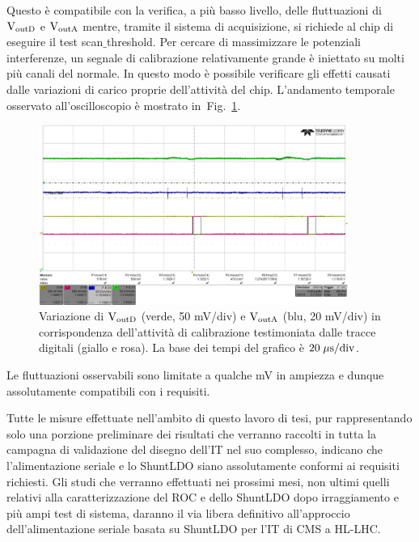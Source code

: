Questo \`e compatibile con la verifica, a pi\`u basso livello, delle fluttuazioni di $\mathrm{V_{outD}}$ e $\mathrm{V_{outA}}$ mentre, tramite il sistema di acquisizione, si richiede al chip di eseguire il test scan$\_$threshold. Per cercare di massimizzare le potenziali interferenze, un segnale di calibrazione relativamente grande \`e iniettato su molti pi\`u canali del normale. In questo modo è possibile verificare gli effetti causati dalle variazioni di carico proprie dell'attività del chip. L'andamento temporale osservato all'oscilloscopio \`e mostrato in~Fig.~\ref{alllin2}.
\begin{figure}
\centering
\includegraphics[width=0.9\textwidth]{Immagini/alllin2}
\caption{Variazione di $\mathrm{V_{outD}}$ (verde, 50 mV/div) e $\mathrm{V_{outA}}$ (blu, 20 mV/div) in corrispondenza dell'attivit\`a di calibrazione testimoniata dalle tracce digitali (giallo e rosa). La base dei tempi del grafico \`e $\mathrm{20\; \mu \rm s/div}$.}
\label{alllin2}
\end{figure}
Le fluttuazioni osservabili sono limitate a qualche mV in ampiezza e dunque assolutamente compatibili con i requisiti.

Tutte le misure effettuate nell'ambito di questo lavoro di tesi, pur rappresentando solo una porzione preliminare dei risultati che verranno raccolti in tutta la campagna di validazione del disegno dell'IT nel suo complesso, indicano che l'alimentazione seriale e lo ShuntLDO siano assolutamente conformi ai requisiti richiesti. Gli studi che verranno effettuati nei prossimi mesi, non ultimi quelli relativi alla caratterizzazione del ROC e dello ShuntLDO dopo irraggiamento e pi\`u ampi test di sistema, daranno il via libera definitivo all'approccio dell'alimentazione seriale basata su ShuntLDO per l'IT di CMS a HL-LHC. 


